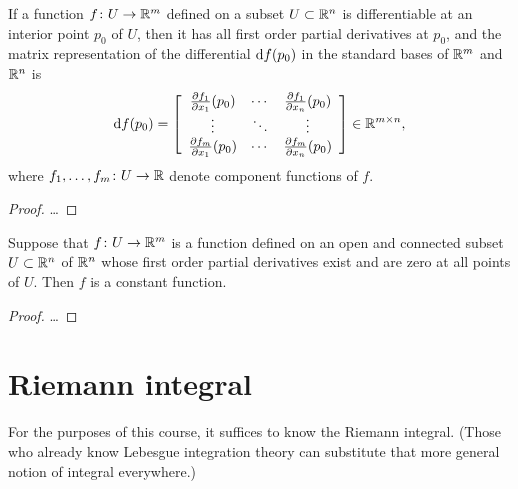 \begin{lemma}
  \label{lem:jacobian_matrix}
  If a function $f \colon U \to \mathbb{R}^m$
  defined on a subset $U \subset \mathbb{R}^n$ is differentiable
  at an interior point $p_0$ of $U$, then it has
  all first order partial derivatives at $p_0$, and the
  matrix representation of the differential $\mathrm{d} f (p_0)$
  in the standard bases of $\mathbb{R}^m$ and $\mathbb{R}^n$ is
  \begin{align*}
    \mathrm{d} f (p_0)
      = \left[ \begin{array}{ccc}
        \frac{\partial f_1}{\partial x_1}(p_0) & \cdots & \frac{\partial f_1}{\partial x_n}(p_0) \\
        \vdots & \ddots & \vdots \\
        \frac{\partial f_m}{\partial x_1}(p_0) & \cdots & \frac{\partial f_m}{\partial x_n}(p_0)
        \end{array} \right]
      \in \mathbb{R}^{m \times n} ,
  \end{align*}
  where $f_1, \ldots, f_m \colon U \to \mathbb{R}$ denote component functions of $f$.
\end{lemma}
\begin{proof}
  \ldots
\end{proof}

\begin{lemma}
  \label{lem:vanishing_partial_derivatives_implies_constant}
  Suppose that $f \colon U \to \mathbb{R}^m$ is a function
  defined on an open and connected subset $U \subset \mathbb{R}^n$ of $\mathbb{R}^n$
  whose first order partial derivatives exist and are zero at all points
  of $U$. Then $f$ is a constant function.
\end{lemma}
\begin{proof}
  \ldots
\end{proof}


\section{Riemann integral}

For the purposes of this course, it suffices to know the Riemann
integral. (Those who already know Lebesgue integration theory can
substitute that more general notion of integral everywhere.)

